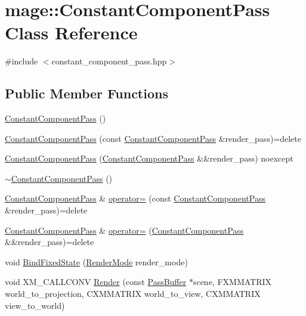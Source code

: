 \hypertarget{classmage_1_1_constant_component_pass}{}\section{mage\+:\+:Constant\+Component\+Pass Class Reference}
\label{classmage_1_1_constant_component_pass}


{\ttfamily \#include $<$constant\+\_\+component\+\_\+pass.\+hpp$>$}

\subsection*{Public Member Functions}
\begin{DoxyCompactItemize}
\item 
\hyperlink{classmage_1_1_constant_component_pass_acd197274863c82c9f1551c7e6171e4c9}{Constant\+Component\+Pass} ()
\item 
\hyperlink{classmage_1_1_constant_component_pass_ac3112acde3a0504febef699873efe1ff}{Constant\+Component\+Pass} (const \hyperlink{classmage_1_1_constant_component_pass}{Constant\+Component\+Pass} \&render\+\_\+pass)=delete
\item 
\hyperlink{classmage_1_1_constant_component_pass_a740def3e95651180a7f2392a922e0706}{Constant\+Component\+Pass} (\hyperlink{classmage_1_1_constant_component_pass}{Constant\+Component\+Pass} \&\&render\+\_\+pass) noexcept
\item 
\hyperlink{classmage_1_1_constant_component_pass_aaa94607b422672dab4cb77f129382d1b}{$\sim$\+Constant\+Component\+Pass} ()
\item 
\hyperlink{classmage_1_1_constant_component_pass}{Constant\+Component\+Pass} \& \hyperlink{classmage_1_1_constant_component_pass_a513b83527fdb17a760032b76f3c17012}{operator=} (const \hyperlink{classmage_1_1_constant_component_pass}{Constant\+Component\+Pass} \&render\+\_\+pass)=delete
\item 
\hyperlink{classmage_1_1_constant_component_pass}{Constant\+Component\+Pass} \& \hyperlink{classmage_1_1_constant_component_pass_ab1944cfe6c59d28d34fb6c6d05bd0b96}{operator=} (\hyperlink{classmage_1_1_constant_component_pass}{Constant\+Component\+Pass} \&\&render\+\_\+pass)=delete
\item 
void \hyperlink{classmage_1_1_constant_component_pass_a87e9d62d5d93b1a66388ab0ccd494e8b}{Bind\+Fixed\+State} (\hyperlink{namespacemage_a5e7e18b0154373ce8fc942fe3f6b27fd}{Render\+Mode} render\+\_\+mode)
\item 
void X\+M\+\_\+\+C\+A\+L\+L\+C\+O\+NV \hyperlink{classmage_1_1_constant_component_pass_aeee741bd38f3e2ae8eea488e91eea72e}{Render} (const \hyperlink{structmage_1_1_pass_buffer}{Pass\+Buffer} $\ast$scene, F\+X\+M\+M\+A\+T\+R\+IX world\+\_\+to\+\_\+projection, C\+X\+M\+M\+A\+T\+R\+IX world\+\_\+to\+\_\+view, C\+X\+M\+M\+A\+T\+R\+IX view\+\_\+to\+\_\+world)
\end{DoxyCompactItemize}
